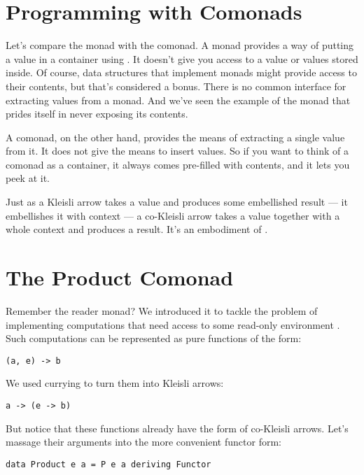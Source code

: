 \section{Programming with Comonads}\label{programming-with-comonads}

Let's compare the monad with the comonad. A monad provides a way of
putting a value in a container using . It doesn't give
you access to a value or values stored inside. Of course, data
structures that implement monads might provide access to their contents,
but that's considered a bonus. There is no common interface for
extracting values from a monad. And we've seen the example of the
 monad that prides itself in never exposing its contents.

A comonad, on the other hand, provides the means of extracting a single
value from it. It does not give the means to insert values. So if you
want to think of a comonad as a container, it always comes pre-filled
with contents, and it lets you peek at it.

Just as a Kleisli arrow takes a value and produces some embellished
result --- it embellishes it with context --- a co-Kleisli arrow takes a
value together with a whole context and produces a result. It's an
embodiment of .

\section{The Product Comonad}\label{the-product-comonad}

Remember the reader monad? We introduced it to tackle the problem of
implementing computations that need access to some read-only environment
. Such computations can be represented as pure functions of
the form:

\begin{verbatim}
(a, e) -> b
\end{verbatim}

We used currying to turn them into Kleisli arrows:

\begin{verbatim}
a -> (e -> b)
\end{verbatim}

But notice that these functions already have the form of co-Kleisli
arrows. Let's massage their arguments into the more convenient functor
form:

\begin{verbatim}
data Product e a = P e a deriving Functor
\end{verbatim}

